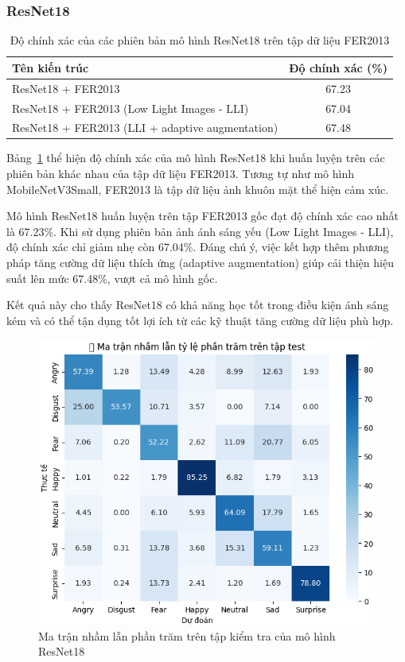 \subsubsection{ResNet18}

\begin{table}[H]
\centering
\caption{Độ chính xác của các phiên bản mô hình ResNet18 trên tập dữ liệu FER2013}
\begin{tabular}{@{}lc@{}}
\toprule
\textbf{Tên kiến trúc} & \textbf{Độ chính xác (\%)} \\ \midrule
ResNet18 + FER2013 & 67.23 \\
ResNet18 + FER2013 (Low Light Images - LLI) & 67.04 \\
ResNet18 + FER2013 (LLI + adaptive augmentation) & 67.48 \\ \bottomrule
\end{tabular}
\label{tab:resnet-results}
\end{table}


Bảng~\ref{tab:resnet-results} thể hiện độ chính xác của mô hình ResNet18 khi huấn luyện trên các phiên bản khác nhau của tập dữ liệu FER2013. Tương tự như mô hình MobileNetV3Small, FER2013 là tập dữ liệu ảnh khuôn mặt thể hiện cảm xúc.

Mô hình ResNet18 huấn luyện trên tập FER2013 gốc đạt độ chính xác cao nhất là 67.23\%. Khi sử dụng phiên bản ảnh ánh sáng yếu (Low Light Images - LLI), độ chính xác chỉ giảm nhẹ còn 67.04\%. Đáng chú ý, việc kết hợp thêm phương pháp tăng cường dữ liệu thích ứng (adaptive augmentation) giúp cải thiện hiệu suất lên mức 67.48\%, vượt cả mô hình gốc.

Kết quả này cho thấy ResNet18 có khả năng học tốt trong điều kiện ánh sáng kém và có thể tận dụng tốt lợi ích từ các kỹ thuật tăng cường dữ liệu phù hợp.



\begin{figure}[H]
\centering
\includegraphics[width=1\textwidth]{img/confusionMatrixResnet18.png}
\caption{Ma trận nhầm lẫn phần trăm trên tập kiểm tra của mô hình ResNet18}
\label{fig:confusion-resnet18}
\end{figure}

